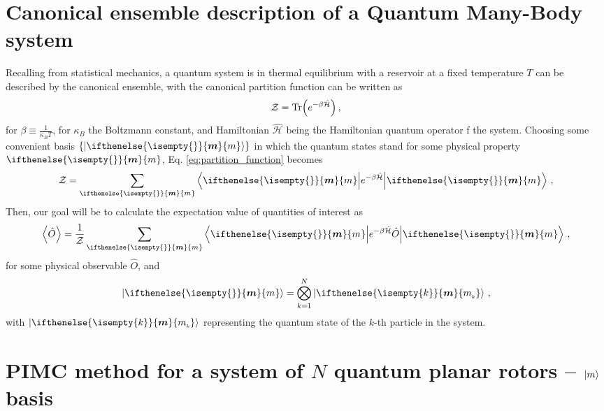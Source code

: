 \documentclass[a4paper,11pt]{article}
\newcommand{\oper}[1]{\hat{#1}}
\newcommand{\1}{{\oper{I}}}
\renewcommand{\H}{\oper{\mathcal{H}}}
\newcommand{\Z}{\mathcal{Z}}
\newcommand{\m}[2]{%
	\ifthenelse{\isempty{#1}}%
	{\vb*{m}^{\hspace{-0.2mm}{#2}}}%
	{m_{\hspace{-0.1mm}\scriptscriptstyle{#1}}^{\hspace{-0.2mm}\scriptscriptstyle{#2}}}%
}
\newcommand{\+}{\uparrow}
\renewcommand{\-}{\downarrow}
\newcommand{\0}{0}
\begin{document}
\section{Canonical ensemble description of a Quantum Many-Body system}
	Recalling from statistical mechanics, a quantum system is in thermal equilibrium with a reservoir at a fixed temperature $T$ can be described by the canonical ensemble, with the canonical partition function can be written as
	\begin{align}
		\label{eq:partition_function}
		\Z = \Tr(e^{-\beta \H}) \, ,
	\end{align}
	for $\beta \equiv \frac{1}{\kappa_B T}$, for $\kappa_B$ the Boltzmann constant, and Hamiltonian $\H$ being the Hamiltonian quantum operator f the system. Choosing some convenient basis $\{\ket{\m{}{}}\}$ in which the quantum states stand for some physical property $\m{}{}$, Eq. \eqref{eq:partition_function} becomes
	\begin{align}
		\label{eq:partition_function_def}
		\Z = \sum_{\m{}{}} \mel**{\m{}{}}{e^{-\beta \H}}{\m{}{}} \, ,
	\end{align}
	Then, our goal will be to calculate the expectation value of quantities of interest as
	\begin{align}
		\label{eq:expectation_value}
		\expval{\oper{O}} = \frac{1}{\Z} \sum_{\m{}{}} \mel**{\m{}{}}{e^{-\beta \H} \oper{O}}{\m{}{}} \, ,
	\end{align}
	for some physical observable $\oper{O}$, and 
	\begin{align}
		\label{eq:def_basis_states}
		\ket{\m{}{}} = \bigotimes_{k=1}^N \ket{\m{k}{}} \, ,
	\end{align}
	with $\ket{\m{k}{}}$ representing the quantum state of the $k$-th particle in the system.
	
\section[PIMC method for a system of N quantum planar rotors -- ang. mom. basis]{PIMC method for a system of $N$ quantum planar rotors -- $\ket{m}$ basis}
	
\end{document}
